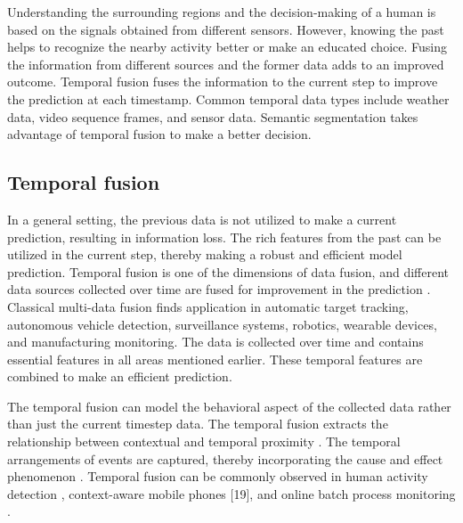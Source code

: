 	Understanding the surrounding regions and the decision-making of a human is based on the signals obtained from different sensors. However, knowing the past helps to recognize the nearby activity better or make an educated choice. Fusing the information from different sources and the former data adds to an improved outcome. Temporal fusion fuses the information to the current step to improve the prediction at each timestamp. Common temporal data types include weather data, video sequence frames, and sensor data. Semantic segmentation takes advantage of temporal fusion to make a better decision. 
    
    \subsection{Temporal fusion}
	
	In a general setting, the previous data is not utilized to make a current prediction, resulting in information loss. The rich features from the past can be utilized in the current step, thereby making a robust and efficient model prediction. Temporal fusion is one of the dimensions of data fusion, and different data sources collected over time are fused for improvement in the prediction \cite{005_hsiao2005temporal}. Classical multi-data fusion finds application in automatic target tracking, autonomous vehicle detection, surveillance systems, robotics, wearable devices, and manufacturing monitoring. The data is collected over time and contains essential features in all areas mentioned earlier. These temporal features are combined to make an efficient prediction. 
    
    The temporal fusion can model the behavioral aspect of the collected data rather than just the current timestep data. The temporal fusion extracts the relationship between contextual and temporal proximity \cite{07_hsiao2005temporal}. The temporal arrangements of events are captured, thereby incorporating the cause and effect phenomenon \cite{07_hsiao2005temporal}. Temporal fusion can be commonly observed in human activity detection \cite{08_krause2003unsupervised}, context-aware mobile phones [19], and online batch process monitoring \cite{09_lee2003line}. 
    
